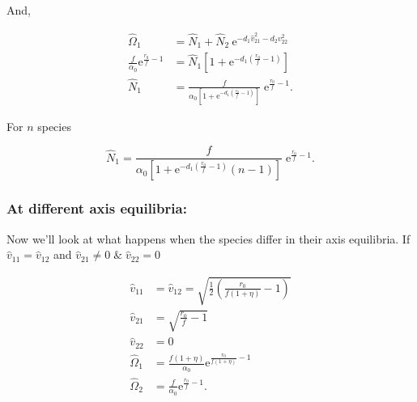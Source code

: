 \noindent And,

\begin{equation} \label{eq:two-axes-v1-nonzero-v2-zero-N}
\begin{split}
    \hat\Omega_1 &= \hat{N}_1 + \hat{N}_2 \: \text{e}^{-d_1 \hat{v}_{21}^2 -
        d_2 v_{22}^2} \\
    \frac{f}{\alpha_0} \textrm{e}^{\frac{r_0}{f} - 1} &= \hat{N}_1 \left[
        1 + \text{e}^{- d_1 \left( \frac{ r_0 }{ f } - 1 \right) } \right] \\
    \hat{N}_1 &= \frac{ f }{ \alpha_0 \left[ 1 + \text{e}^{- d_1 \left(
        \frac{ r_0 }{ f } - 1 \right) } \right] } \; \text{e}^{\frac{r_0}{f} - 1}
    \text{.}
\end{split}
\end{equation}


For $n$ species

\begin{equation} \label{eq:two-axes-v1-nonzero-v2-zero-N-n-species}
    \hat{N}_1 = \frac{ f }{ \alpha_0 \left[ 1 + \text{e}^{- d_1 \left(
        \frac{ r_0 }{ f } - 1 \right) } (n - 1) \right] } \; \text{e}^{\frac{r_0}{f} - 1}
    \text{.}
\end{equation}






\subsubsection*{At different axis equilibria:}




Now we'll look at what happens when the species differ in their axis equilibria.
If $\hat{v}_{11} = \hat{v}_{12}$ and $\hat{v}_{21} \ne 0 \; \& \; \hat{v}_{22} = 0$

\begin{equation*}
\begin{split}
    \hat{v}_{11} &= \hat{v}_{12} = \sqrt{\frac{1}{2}
        \left( \frac{r_0}{f (1 + \eta)} - 1 \right)} \\
    \hat{v}_{21} &= \sqrt{ \frac{ r_0 }{ f } - 1 } \\
    \hat{v}_{22} &= 0 \\
    \hat\Omega_1 &= \frac{f (1 + \eta)}{\alpha_0}
        \text{e}^{\frac{r_0}{f (1 + \eta)} - 1} \\
    \hat\Omega_2 &= \frac{f}{\alpha_0} \textrm{e}^{\frac{r_0}{f} - 1}
    \text{.}
\end{split}
\end{equation*}

